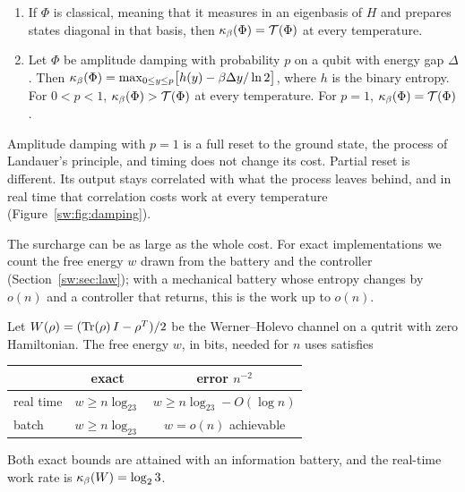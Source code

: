 \begin{theorem}\label{sw:thm:classical}\leavevmode
\begin{enumerate}[label=(\alph*), leftmargin=*]
\item If $\Phi$ is classical, meaning that it measures in an eigenbasis of $H$ and prepares states diagonal in that basis, then $\kappa_\beta(\Phi)=\mathcal T(\Phi)$ at every temperature.
\item Let $\Phi$ be amplitude damping with probability $p$ on a qubit with energy gap $\Delta$. Then $\kappa_\beta(\Phi)=\max_{0\le y\le p}\bigl[h(y)-\beta\Delta y/\ln 2\bigr]$, where $h$ is the binary entropy. For $0<p<1$, $\kappa_\beta(\Phi)>\mathcal T(\Phi)$ at every temperature. For $p=1$, $\kappa_\beta(\Phi)=\mathcal T(\Phi)$.
\end{enumerate}
\end{theorem}

Amplitude damping with $p=1$ is a full reset to the ground state, the process of Landauer's principle, and timing does not change its cost. Partial reset is different. Its output stays correlated with what the process leaves behind, and in real time that correlation costs work at every temperature (Figure~\ref{sw:fig:damping}).

The surcharge can be as large as the whole cost. For exact implementations we count the free energy $w$ drawn from the battery and the controller (Section~\ref{sw:sec:law}); with a mechanical battery whose entropy changes by $o(n)$ and a controller that returns, this is the work up to $o(n)$.

\begin{theorem}\label{sw:thm:werner}
Let $W(\rho)=(\operatorname{Tr}(\rho)\,I-\rho^{T})/2$ be the Werner--Holevo channel on a qutrit with zero Hamiltonian. The free energy $w$, in bits, needed for $n$ uses satisfies
\begin{center}
\begin{tabular}{lcc}
\toprule
 & exact & error $n^{-2}$\\
\midrule
real time & $w\ge n\log_23$ & $w\ge n\log_23-O(\log n)$\\
batch & $w\ge n\log_23$ & $w=o(n)$ achievable\\
\bottomrule
\end{tabular}
\end{center}
Both exact bounds are attained with an information battery, and the real-time work rate is $\kappa_\beta(W)=\log_23$.
\end{theorem}

